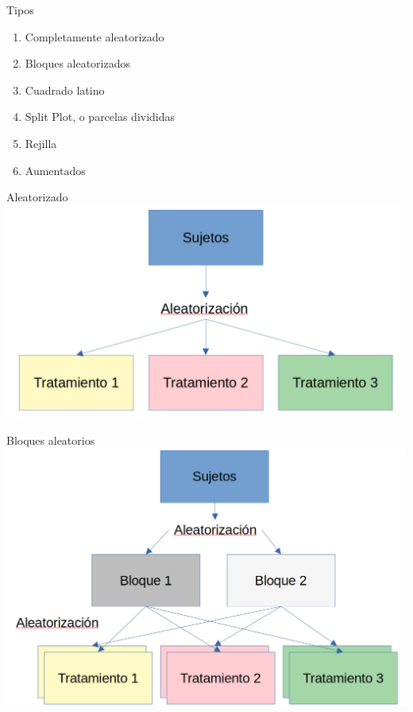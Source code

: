 \documentclass[
  11pt,
  ignorenonframetext,
]{beamer}
\begin{document}
\begin{frame}{Tipos}
\protect\hypertarget{tipos}{}
\begin{enumerate}
\item
  Completamente aleatorizado
\item
  Bloques aleatorizados
\item
  Cuadrado latino
\item
  Split Plot, o parcelas divididas
\item
  Rejilla
\item
  Aumentados
\end{enumerate}
\end{frame}

\begin{frame}{Aleatorizado}
\protect\hypertarget{aleatorizado}{}
\includegraphics{Figuras-disenos/Aleatorizado.png}
\end{frame}

\begin{frame}{Bloques aleatorios}
\protect\hypertarget{bloques-aleatorios}{}
\includegraphics{Figuras-disenos/Bloques.png}
\end{frame}
\end{document}
